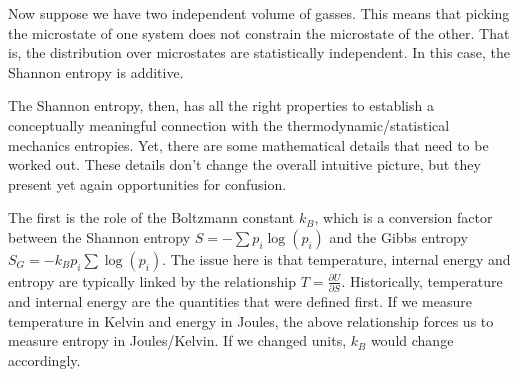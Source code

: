 \documentclass{article}
\begin{document}
Now suppose we have two independent volume of gasses. This means that picking the microstate of one system does not constrain the microstate of the other. That is, the distribution over microstates are statistically independent. In this case, the Shannon entropy is additive.

The Shannon entropy, then, has all the right properties to establish a conceptually meaningful connection with the thermodynamic/statistical mechanics entropies. Yet, there are some mathematical details that need to be worked out. These details don't change the overall intuitive picture, but they present yet again opportunities for confusion.

The first is the role of the Boltzmann constant $k_B$, which is a conversion factor between the Shannon entropy $S = - \sum p_i \log(p_i)$ and the Gibbs entropy $S_G = - k_B p_i \sum \log(p_i)$. The issue here is that temperature, internal energy and entropy are typically linked by the relationship $T = \frac{\partial U}{\partial S}$. Historically, temperature and internal energy are the quantities that were defined first. If we measure temperature in Kelvin and energy in Joules, the above relationship forces us to measure entropy in Joules/Kelvin. If we changed units, $k_B$ would change accordingly.
\end{document}
